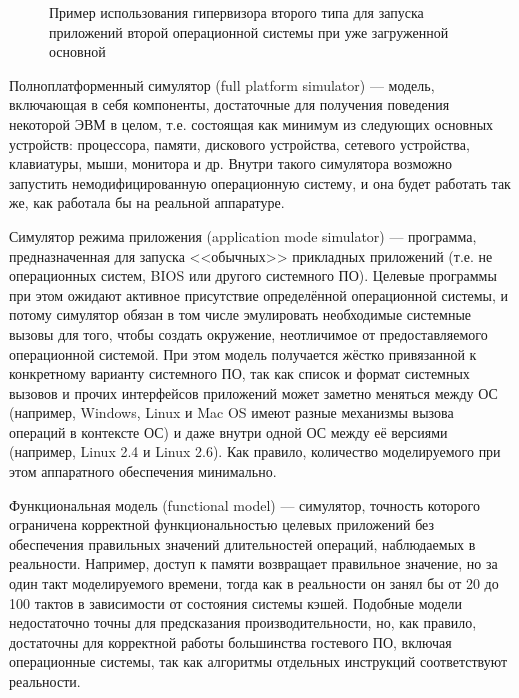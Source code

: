 \begin{description*}
\begin{figure}[htp]
    \caption[Гипервизор второго типа]{Пример использования гипервизора второго типа для запуска приложений второй операционной системы при уже загруженной основной}\label{fig:vm-type2}
\end{figure}

\item[Полноплатформенный симулятор] (\abbr full platform si\-mu\-la\-tor) --- модель, включающая в себя компоненты, достаточные для получения поведения некоторой ЭВМ в целом, т.е. состоящая как минимум из следующих основных устройств: процессора, памяти, дискового устройства, сетевого устройства, клавиатуры, мыши, монитора и др. Внутри такого симулятора возможно запустить немодифицированную операционную систему, и она будет работать так же, как работала бы на реальной аппаратуре.

\item[Симулятор режима приложения] (\abbr application mode si\-mu\-la\-tor) --- программа, предназначенная для запуска <<обычных>> прикладных приложений (т.е. не операционных систем, BIOS или другого системного ПО). Целевые программы при этом ожидают активное присутствие определённой операционной системы, и потому симулятор обязан в том числе эмулировать необходимые  системные вызовы для того, чтобы создать окружение, неотличимое от предоставляемого операционной системой. При этом модель получается жёстко привязанной к конкретному варианту системного ПО, так как список и формат системных вызовов и прочих интерфейсов приложений может заметно меняться между ОС (например, Windows, Linux и Mac OS имеют разные механизмы вызова операций в контексте ОС) и даже внутри одной ОС между её версиями (например, Linux 2.4 и Linux 2.6). Как правило, количество моделируемого при этом аппаратного обеспечения минимально.

\item[Функциональная модель] (\abbr functional model) --- симулятор, точность которого ограничена корректной функциональностью целевых приложений без обеспечения правильных значений длительностей операций, наблюдаемых в реальности. Например, доступ к памяти возвращает правильное значение, но за один такт моделируемого времени, тогда как в реальности он занял бы от 20 до 100 тактов в зависимости от состояния системы кэшей. Подобные модели недостаточно точны для предсказания производительности, но, как правило, достаточны для корректной работы большинства гостевого ПО, включая операционные системы, так как алгоритмы отдельных инструкций соответствуют реальности.


\end{description*}

